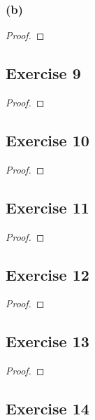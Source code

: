 \documentclass[14pt]{extarticle}
\begin{document}
\subsubsection{(b)}

\begin{proof}

\end{proof}

\subsection{Exercise 9}

\begin{proof}

\end{proof}

\subsection{Exercise 10}

\begin{proof}

\end{proof}

\subsection{Exercise 11}

\begin{proof}

\end{proof}

\subsection{Exercise 12}

\begin{proof}

\end{proof}

\subsection{Exercise 13}

\begin{proof}

\end{proof}

\subsection{Exercise 14}
\end{document}
